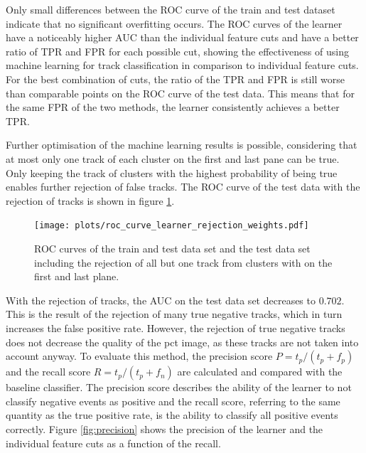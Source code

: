 
Only small differences between the ROC curve of the train and test dataset indicate that no significant overfitting occurs.
The ROC curves of the learner have a noticeably higher AUC than the individual feature cuts and have a better ratio of TPR and FPR for each possible cut, showing the effectiveness
of using machine learning for track classification in comparison to individual feature cuts. For the best combination of cuts, the ratio of the TPR and FPR is still worse than
comparable points on the ROC curve of the test data. This means that for the same FPR of the two methods, the learner consistently achieves a better TPR.

Further optimisation of the machine learning results is possible, considering that at most only one track of each cluster
on the first and last pane can be true. Only keeping the track of clusters with the highest probability of being true enables further rejection of
false tracks. The ROC curve of the test data with the rejection of tracks is shown in figure \ref{fig:rejection}.


\begin{figure}
  \centering
  \texttt{[image: plots/roc\_curve\_learner\_rejection\_weights.pdf]}
  \caption{ROC curves of the train and test data set and the test data set including the rejection of all but one track from clusters with on the first and last plane.}
  \label{fig:rejection}
\end{figure}

With the rejection of tracks, the AUC on the test data set decreases to $0.702$. This is the result of the rejection of many true negative tracks, which in turn increases
the false positive rate. However, the rejection of true negative tracks does not decrease the quality of the pct image, as these tracks are not taken into account anyway.
To evaluate this method, the precision score $P=t_p/(t_p + f_p)$ and the recall score $R=t_p/(t_p + f_n)$ are calculated and compared with the baseline classifier. The precision
score describes the ability of the learner to not classify negative events as positive and the recall score, referring to the same quantity as the true positive rate,
is the ability to classify all positive events correctly.
Figure \ref{fig:precision} shows the precision of the learner and the individual feature cuts as a function of the recall.

